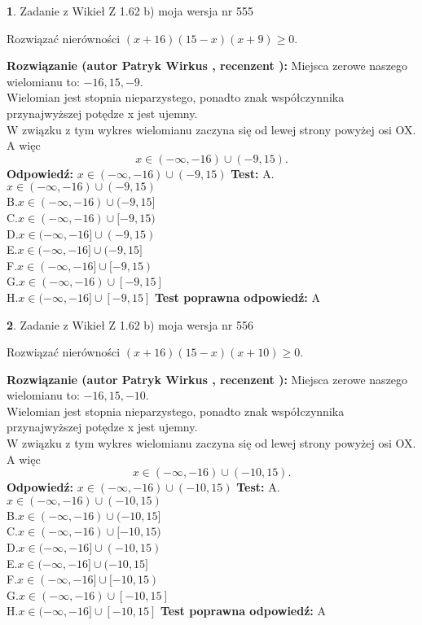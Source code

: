 \documentclass[12pt, a4paper]{article}
\theoremstyle{definition} %
\newtheorem{zad}{}
\newcommand{\zadStart}[1]{\begin{zad}#1\newline}
\newcommand{\zadStop}{\end{zad}}
\newcommand{\rozwStart}[2]{\noindent \textbf{Rozwiązanie (autor #1 , recenzent #2): }\newline}
\newcommand{\rozwStop}{\newline}
\newcommand{\odpStart}{\noindent \textbf{Odpowiedź:}\newline}
\newcommand{\odpStop}{\newline}
\newcommand{\testStart}{\noindent \textbf{Test:}\newline}
\newcommand{\testStop}{\newline}
\newcommand{\kluczStart}{\noindent \textbf{Test poprawna odpowiedź:}\newline}
\newcommand{\kluczStop}{\newline}
\begin{document}
\zadStart{Zadanie z Wikieł Z 1.62 b) moja wersja nr 555}

Rozwiązać nierówności $(x+16)(15-x)(x+9)\ge0$.
\zadStop
\rozwStart{Patryk Wirkus}{}
Miejsca zerowe naszego wielomianu to: $-16, 15, -9$.\\
Wielomian jest stopnia nieparzystego, ponadto znak współczynnika przy\linebreak najwyższej potędze x jest ujemny.\\ W związku z tym wykres wielomianu zaczyna się od lewej strony powyżej osi OX. A więc $$x \in (-\infty,-16) \cup (-9,15).$$
\rozwStop
\odpStart
$x \in (-\infty,-16) \cup (-9,15)$
\odpStop
\testStart
A.$x \in (-\infty,-16) \cup (-9,15)$\\
B.$x \in (-\infty,-16) \cup (-9,15]$\\
C.$x \in (-\infty,-16) \cup [-9,15)$\\
D.$x \in (-\infty,-16] \cup (-9,15)$\\
E.$x \in (-\infty,-16] \cup (-9,15]$\\
F.$x \in (-\infty,-16] \cup [-9,15)$\\
G.$x \in (-\infty,-16) \cup [-9,15]$\\
H.$x \in (-\infty,-16] \cup [-9,15]$
\testStop
\kluczStart
A
\kluczStop



\zadStart{Zadanie z Wikieł Z 1.62 b) moja wersja nr 556}

Rozwiązać nierówności $(x+16)(15-x)(x+10)\ge0$.
\zadStop
\rozwStart{Patryk Wirkus}{}
Miejsca zerowe naszego wielomianu to: $-16, 15, -10$.\\
Wielomian jest stopnia nieparzystego, ponadto znak współczynnika przy\linebreak najwyższej potędze x jest ujemny.\\ W związku z tym wykres wielomianu zaczyna się od lewej strony powyżej osi OX. A więc $$x \in (-\infty,-16) \cup (-10,15).$$
\rozwStop
\odpStart
$x \in (-\infty,-16) \cup (-10,15)$
\odpStop
\testStart
A.$x \in (-\infty,-16) \cup (-10,15)$\\
B.$x \in (-\infty,-16) \cup (-10,15]$\\
C.$x \in (-\infty,-16) \cup [-10,15)$\\
D.$x \in (-\infty,-16] \cup (-10,15)$\\
E.$x \in (-\infty,-16] \cup (-10,15]$\\
F.$x \in (-\infty,-16] \cup [-10,15)$\\
G.$x \in (-\infty,-16) \cup [-10,15]$\\
H.$x \in (-\infty,-16] \cup [-10,15]$
\testStop
\kluczStart
A
\kluczStop
\end{document}
